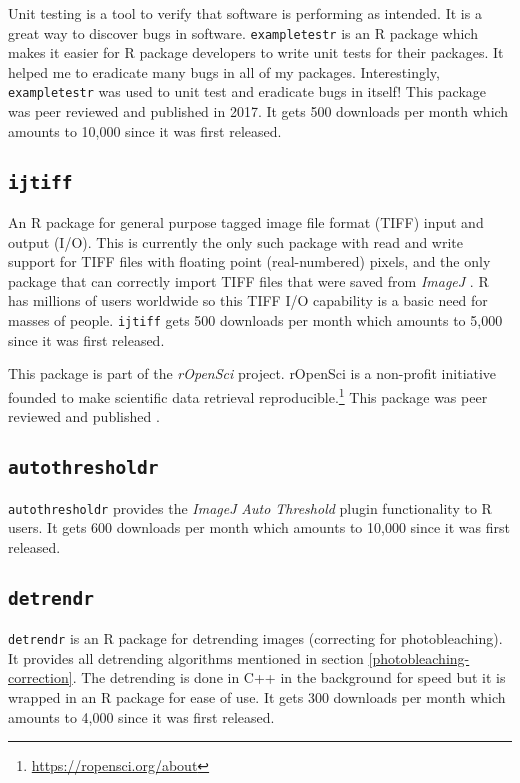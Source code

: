 \documentclass[12pt,]{book}
\let\rmarkdownfootnote\footnote%
\def\footnote{\protect\rmarkdownfootnote}
\theoremstyle{definition}
\theoremstyle{definition}
\theoremstyle{definition}
\theoremstyle{remark}
\begin{document}
Unit testing is a tool to verify that software is performing as
intended. It is a great way to discover bugs in software.
\texttt{exampletestr} is an R package which makes it easier for R
package developers to write unit tests for their packages. It helped me
to eradicate many bugs in all of my packages. Interestingly,
\texttt{exampletestr} was used to unit test and eradicate bugs in
itself! This package was peer reviewed and published in
2017.\citep{exampletestr} It gets 500 downloads per month which amounts
to 10,000 since it was first released.

\subsection{\texorpdfstring{\texttt{ijtiff}}{ijtiff}}\label{ijtiff}

An R package for general purpose tagged image file format (TIFF) input
and output (I/O). This is currently the only such package with read and
write support for TIFF files with floating point (real-numbered) pixels,
and the only package that can correctly import TIFF files that were
saved from \emph{ImageJ} \citep{ImageJ}. R has millions of users
worldwide so this TIFF I/O capability is a basic need for masses of
people. \texttt{ijtiff} gets 500 downloads per month which amounts to
5,000 since it was first released.

This package is part of the \emph{rOpenSci} project. rOpenSci is a
non-profit initiative founded to make scientific data retrieval
reproducible.\footnote{\url{https://ropensci.org/about}} This package
was peer reviewed and published \citep{ijtiff}.

\subsection{\texorpdfstring{\texttt{autothresholdr}}{autothresholdr}}\label{autothresholdr}

\texttt{autothresholdr} provides the \emph{ImageJ} \citep{ImageJ}
\emph{Auto Threshold} plugin \citep{autothresholdr} functionality to R
users. It gets 600 downloads per month which amounts to 10,000 since it
was first released.

\subsection{\texorpdfstring{\texttt{detrendr}}{detrendr}}\label{detrendr}

\texttt{detrendr} is an R package for detrending images (correcting for
photobleaching). It provides all detrending algorithms mentioned in
section \ref{photobleaching-correction}. The detrending is done in C++
in the background for speed but it is wrapped in an R package for ease
of use. It gets 300 downloads per month which amounts to 4,000 since it
was first released.
\end{document}
